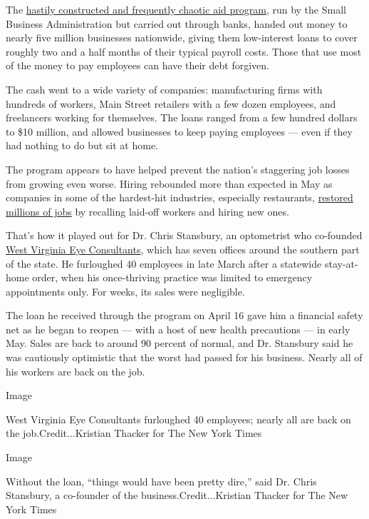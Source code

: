 The
\href{https://www.nytimes3xbfgragh.onion/2020/04/26/business/ppp-small-business-loans.html}{hastily
constructed and frequently chaotic aid program}, run by the Small
Business Administration but carried out through banks, handed out money
to nearly five million businesses nationwide, giving them low-interest
loans to cover roughly two and a half months of their typical payroll
costs. Those that use most of the money to pay employees can have their
debt forgiven.

The cash went to a wide variety of companies: manufacturing firms with
hundreds of workers, Main Street retailers with a few dozen employees,
and freelancers working for themselves. The loans ranged from a few
hundred dollars to \$10 million, and allowed businesses to keep paying
employees --- even if they had nothing to do but sit at home.

The program appears to have helped prevent the nation's staggering job
losses from growing even worse. Hiring rebounded more than expected in
May as companies in some of the hardest-hit industries, especially
restaurants,
\href{https://www.nytimes3xbfgragh.onion/2020/06/05/business/economy/jobs-report.html}{restored
millions of jobs} by recalling laid-off workers and hiring new ones.

That's how it played out for Dr. Chris Stansbury, an optometrist who
co-founded \href{https://www.wv-eye.com/}{West Virginia Eye
Consultants}, which has seven offices around the southern part of the
state. He furloughed 40 employees in late March after a statewide
stay-at-home order, when his once-thriving practice was limited to
emergency appointments only. For weeks, its sales were negligible.

The loan he received through the program on April 16 gave him a
financial safety net as he began to reopen --- with a host of new health
precautions --- in early May. Sales are back to around 90 percent of
normal, and Dr. Stansbury said he was cautiously optimistic that the
worst had passed for his business. Nearly all of his workers are back on
the job.

Image

West Virginia Eye Consultants furloughed 40 employees; nearly all are
back on the job.Credit...Kristian Thacker for The New York Times

Image

Without the loan, ``things would have been pretty dire,'' said Dr. Chris
Stansbury, a co-founder of the business.Credit...Kristian Thacker for
The New York Times

